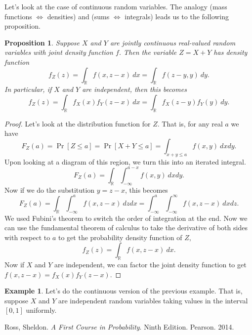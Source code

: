 \documentclass[12pt]{article}
\theoremstyle{plain}
\newtheorem{proposition}[theorem]{Proposition}
\theoremstyle{definition}
\newtheorem{example}[theorem]{Example}
\theoremstyle{remark}
\newcommand{\R}{\mathbb{R}}
\begin{document}
Let's look at the case of continuous random variables.
The analogy (mass functions $\iff$ densities) and (sums $\iff$ integrals) leads us to the following proposition.
\begin{proposition}
    Suppose $X$ and $Y$ are jointly continuous real-valued random variables with joint density function $f$.
    Then the variable $Z = X+Y$ has density function
    \[
        f_Z(z) = \int_\R f(x, z-x)\ dx = \int_\R f(z-y, y)\ dy.
    \]
    In particular, if $X$ and $Y$ are independent, then this becomes
    \[
        f_Z(z) = \int_\R f_X(x)f_Y(z-x)\ dx = \int_\R f_X(z-y)f_Y(y)\ dy.
    \]
\end{proposition}
\begin{proof}
    Let's look at the distribution function for $Z$.
    That is, for any real $a$ we have
    \[
        F_Z(a) = \Pr[Z\leq a] = \Pr[X+Y \leq a] = \int_{x + y\leq a}f(x,y)\ dxdy.
    \]
    Upon looking at a diagram of this region, we turn this into an iterated integral.
    \[
        F_Z(a) = \int_\R \int_{-\infty}^{a-x}f(x, y)\ dxdy.
    \]
    Now if we do the substitution $y = z-x$, this becomes
    \[
        F_Z(a) = \int_\R\int_{-\infty}^af(x, z-x)\ dzdx = \int_{-\infty}^a\int_{-\infty}^\infty f(x, z-x)\ dxdz.
    \]
    We used Fubini's theorem to switch the order of integration at the end.
    Now we can use the fundamental theorem of calculus to take the derivative of both sides with respect to $a$ to get the probability density function of $Z$,
    \[
        f_Z(z) = \int_\R f(x, z-x)\ dx.
    \]
    Now if $X$ and $Y$ are independent, we can factor the joint density function to get $f(x,z-x) = f_X(x)f_Y(z-x)$.
\end{proof}

\begin{example}
    Let's do the continuous version of the previous example.
    That is, suppose $X$ and $Y$ are independent random variables taking values in the interval $[0, 1]$ uniformly.
\end{example}



\begin{thebibliography}{13}

 Ross, Sheldon. \textit{A First Course in Probability}. Ninth Edition. Pearson. 2014.



 
\end{thebibliography}
\end{document}
